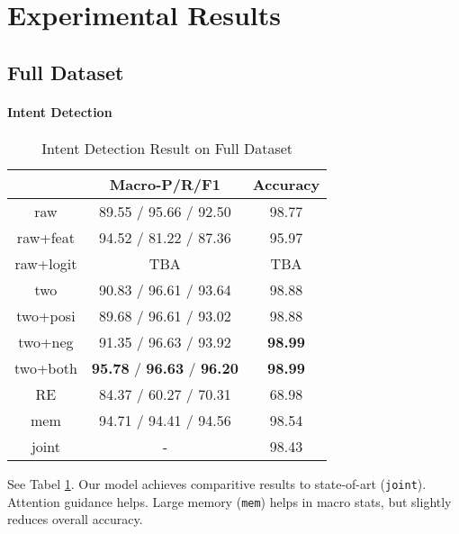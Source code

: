 \section{Experimental Results}
\label{sec:experiments}

\subsection{Full Dataset}

\paragraph{Intent Detection}

\begin{table}
\setlength{\tabcolsep}{0.23em}
\centering
\small{
\begin{tabular}{|c|c|c|}

\hline
  & Macro-P/R/F1 & Accuracy  \\
\hline
raw & 89.55 / 95.66 / 92.50 & 98.77  \\
\hline
raw+feat & 94.52 / 81.22 / 87.36 & 95.97  \\
\hline
raw+logit & TBA & TBA  \\
\hline
two & 90.83 / 96.61 / 93.64 & 98.88 \\
\hline
two+posi & 89.68 / 96.61 / 93.02 & 98.88 \\
\hline
two+neg & 91.35 / 96.63 / 93.92 & \textbf{98.99} \\
\hline
two+both & \textbf{95.78} / \textbf{96.63} / \textbf{96.20} & \textbf{98.99} \\
\hline
\hline
RE & 84.37 / 60.27 / 70.31 & 68.98 \\
\hline
mem & 94.71 / 94.41 / 94.56 & 98.54 \\
\hline
joint & - & 98.43 \\
\hline 

\end{tabular}
}
\caption{Intent Detection Result on Full Dataset}
\label{tab_intent_full}
\end{table}

See Tabel \ref{tab_intent_full}.
Our model achieves comparitive results to state-of-art (\texttt{joint}). Attention guidance helps. Large memory (\texttt{mem}) helps in macro stats, but slightly reduces overall accuracy.


